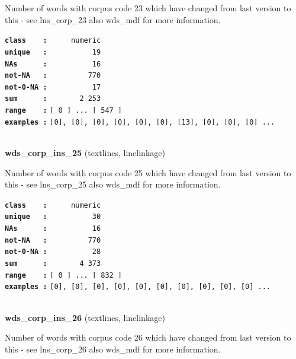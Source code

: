 \documentclass[]{article}
\begin{document}
Number of words with corpus code 23 which have changed from last version
to this - see lns\_corp\_23 also wds\_mdf for more information.

\textbf{\texttt{class\ \ \ \ :}} \texttt{~~~~~numeric}\\
\textbf{\texttt{unique\ \ \ :}} \texttt{~~~~~~~~~~19}\\
\textbf{\texttt{NAs\ \ \ \ \ \ :}} \texttt{~~~~~~~~~~16}\\
\textbf{\texttt{not-NA\ \ \ :}} \texttt{~~~~~~~~~770}\\
\textbf{\texttt{not-0-NA\ :}} \texttt{~~~~~~~~~~17}\\
\textbf{\texttt{sum\ \ \ \ \ \ :}} \texttt{~~~~~~~2~253}\\
\textbf{\texttt{range\ \ \ \ :}}
\texttt{{[}\ 0\ {]}\ ...\ {[}\ 547\ {]}}\\
\textbf{\texttt{examples\ :}}
\texttt{{[}0{]},\ {[}0{]},\ {[}0{]},\ {[}0{]},\ {[}0{]},\ {[}0{]},\ {[}13{]},\ {[}0{]},\ {[}0{]},\ {[}0{]}\ ...}\\

~

\textbf{wds\_corp\_ins\_25} (textlines, linelinkage)

Number of words with corpus code 25 which have changed from last version
to this - see lns\_corp\_25 also wds\_mdf for more information.

\textbf{\texttt{class\ \ \ \ :}} \texttt{~~~~~numeric}\\
\textbf{\texttt{unique\ \ \ :}} \texttt{~~~~~~~~~~30}\\
\textbf{\texttt{NAs\ \ \ \ \ \ :}} \texttt{~~~~~~~~~~16}\\
\textbf{\texttt{not-NA\ \ \ :}} \texttt{~~~~~~~~~770}\\
\textbf{\texttt{not-0-NA\ :}} \texttt{~~~~~~~~~~28}\\
\textbf{\texttt{sum\ \ \ \ \ \ :}} \texttt{~~~~~~~4~373}\\
\textbf{\texttt{range\ \ \ \ :}}
\texttt{{[}\ 0\ {]}\ ...\ {[}\ 832\ {]}}\\
\textbf{\texttt{examples\ :}}
\texttt{{[}0{]},\ {[}0{]},\ {[}0{]},\ {[}0{]},\ {[}0{]},\ {[}0{]},\ {[}0{]},\ {[}0{]},\ {[}0{]},\ {[}0{]}\ ...}\\

~

\textbf{wds\_corp\_ins\_26} (textlines, linelinkage)

Number of words with corpus code 26 which have changed from last version
to this - see lns\_corp\_26 also wds\_mdf for more information.
\end{document}
